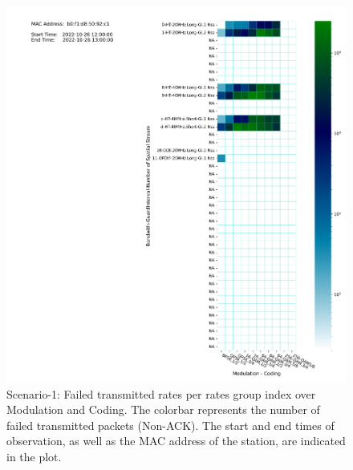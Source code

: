 \begin{figure}[hbt!]
  \centering
  \includegraphics[width=\textwidth]{figures/plots/Scenario-1/G1-coldmap-b0:f1:d8:50:92:c1-22-1652-351697.png}
  \caption[Rate-Based Packet Failure Analysis]{Scenario-1: Failed transmitted rates per rates group index over Modulation and Coding. The colorbar represents the number of failed transmitted packets (Non-ACK). The start and end times of observation, as well as the MAC address of the station, are indicated in the plot.}
  \label{fig:Fail-count1}
\end{figure}
\FloatBarrier 


